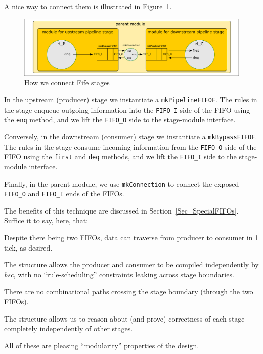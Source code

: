 A nice way to connect them is illustrated in
Figure~\ref{Fig_Composed_FIFO_modularity_1}.
\begin{figure}[htbp]
  \centerline{\includegraphics[width=6in,angle=0]{Figures/Fig_Composed_FIFO_modularity}}
  \caption{\label{Fig_Composed_FIFO_modularity_1}
           How we connect Fife stages}
\end{figure}

In the upstream (producer) stage we instantiate a
\verb|mkPipelineFIFOF|.  The rules in the stage enqueue outgoing
information into the \verb|FIFO_I| side of the FIFO using the
\verb|enq| method, and we lift the \verb|FIFO_O| side to the
stage-module interface.

Conversely, in the downstream (consumer) stage we instantiate a
\verb|mkBypassFIFOF|.  The rules in the stage consume incoming
information from the \verb|FIFO_O| side of the FIFO using the
\verb|first| and \verb|deq| methods, and we lift the \verb|FIFO_I|
side to the stage-module interface.

Finally, in the parent module, we use \verb|mkConnection| to connect
the exposed \verb|FIFO_O| and \verb|FIFO_I| ends of the FIFOs.

The benefits of this technique are discussed in
Section~\ref{Sec_SpecialFIFOs}.  Suffice it to say, here, that:

\begin{tightlist}

 \item Despite there being two FIFOs, data can traverse from producer
       to consumer in 1 tick, as desired.

 \item The structure allows the producer and consumer to be compiled
       independently by \emph{bsc}, with no ``rule-scheduling''
       constraints leaking across stage boundaries.

 \item There are no combinational paths crossing the stage boundary
       (through the two FIFOs).

 \item The structure allows us to reason about (and prove) correctness
       of each stage completely independently of other stages.

\end{tightlist}
All of these are pleasing ``modularity'' properties of the design.

